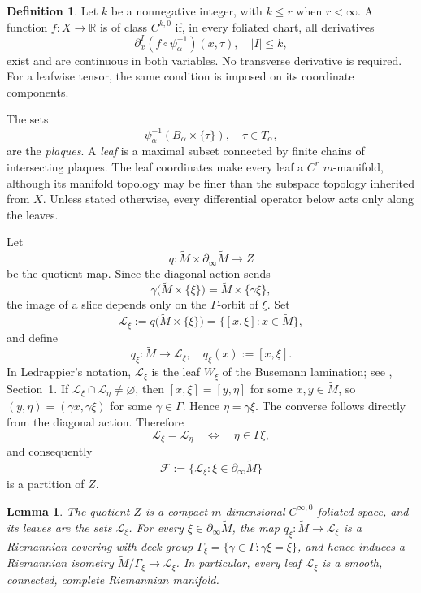 \documentclass[12pt]{amsart}
\newtheorem{lemma}[theorem]{Lemma}
\theoremstyle{definition}
\newtheorem{definition}[theorem]{Definition}
\numberwithin{equation}{section}
\newcommand{\mc}{\mathcal}
\newcommand{\wti}{\widetilde}
\begin{document}
\begin{definition}
\label{def:Ck0}
Let \(k\) be a nonnegative integer, with \(k\leq r\) when
\(r<\infty\).  A function \(f\colon X\to\mathbb R\) is of class
\(C^{k,0}\) if, in every foliated chart, all derivatives
\[
  \partial_x^I(f\circ\psi_\alpha^{-1})(x,\tau),
  \quad |I|\leq k,
\]
exist and are continuous in both variables.  No transverse derivative is
required.  For a leafwise tensor, the same condition is imposed on its
coordinate components.
\end{definition}

The sets
\[
  \psi_\alpha^{-1}(B_\alpha\times\{\tau\}),
  \quad \tau\in T_\alpha,
\]
are the \emph{plaques}.  A \emph{leaf} is a maximal subset connected by
finite chains of intersecting plaques.  The leaf coordinates make every
leaf a \(C^r\) \(m\)-manifold, although its manifold topology may be
finer than the subspace topology inherited from \(X\).  Unless stated
otherwise, every differential operator below acts only along the leaves.

Let
\[
  q\colon
  \wti M\times\partial_\infty\wti M
  \longrightarrow Z
\]
be the quotient map.  Since the diagonal action sends
\[
  \gamma\bigl(\wti M\times\{\xi\}\bigr)
  =
  \wti M\times\{\gamma\xi\},
\]
the image of a slice depends only on the \(\Gamma\)-orbit of \(\xi\).
Set
\[
  \mc L_\xi
  :=q\bigl(\wti M\times\{\xi\}\bigr)
  =\{[x,\xi]:x\in\wti M\},
\]
and define
\[
  q_\xi\colon\wti M\longrightarrow\mc L_\xi,
  \quad
  q_\xi(x):=[x,\xi].
\]
In Ledrappier's notation, \(\mc L_\xi\) is the leaf \(W_\xi\) of the
Busemann lamination; see \cite{Ledrappier2010}, Section~1.
If \(\mc L_\xi\cap\mc L_\eta\neq\varnothing\), then
\([x,\xi]=[y,\eta]\) for some \(x,y\in\wti M\), so
\((y,\eta)=(\gamma x,\gamma\xi)\) for some \(\gamma\in\Gamma\).  Hence
\(\eta=\gamma\xi\).  The converse follows directly from the diagonal
action.  Therefore
\[
  \mc L_\xi=\mc L_\eta
  \quad\Longleftrightarrow\quad
  \eta\in\Gamma\xi,
\]
and consequently
\[
  \mc F:=\{\mc L_\xi:\xi\in\partial_\infty\wti M\}
\]
is a partition of \(Z\).

\begin{lemma}
\label{lem:suspension-foliation}
The quotient \(Z\) is a compact \(m\)-dimensional
\(C^{\infty,0}\) foliated space, and its leaves are the sets
\(\mc L_\xi\).  For every \(\xi\in\partial_\infty\wti M\), the map
\(q_\xi\colon\wti M\to\mc L_\xi\) is a Riemannian covering with deck
group
\(\Gamma_\xi=\{\gamma\in\Gamma:\gamma\xi=\xi\}\), and hence induces a
Riemannian isometry
\(\wti M/\Gamma_\xi\to\mc L_\xi\).  In particular, every leaf
\(\mc L_\xi\) is a smooth, connected, complete Riemannian manifold.
\end{lemma}
\end{document}
